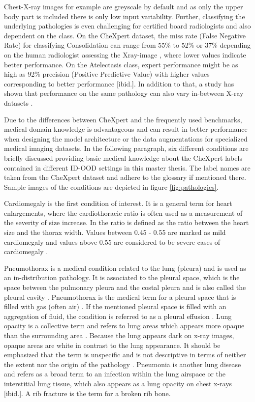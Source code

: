 Chest-X-ray images for example are greyscale by default and as only the upper body part is included there is only low input variability.
Further, classifying the underlying pathologies is even challenging for certified board radiologists and also dependent on the class.
On the CheXpert dataset, the miss rate (False Negative Rate) for classifying Consolidation can range from 55\% to 52\% or 37\% depending on the human radiologist assessing the Xray-image \citep{Irvin2019}, where lower values indicate better performance.
On the Atelectasis class, expert performance might be as high as 92\% precision (Positive Predictive Value) with higher values corresponding to better performance [ibid.].
In addition to that, a study has shown that performance on the same pathology can also vary in-between X-ray datasets \citep{Majkowska2020}.
\par
Due to the differences between CheXpert and the frequently used benchmarks, medical domain knowledge is advantageous and can result in better performance when designing the model architecture or the data augmentations for specialized medical imaging datasets.
In the following paragraph, six different conditions are briefly discussed providing basic medical knowledge about the CheXpert labels contained in different ID-OOD settings in this master thesis.
The label names are taken from the CheXpert dataset \citep{Irvin2019} and adhere to the glossary \citep{Hansell2008} if mentioned there.
Sample images of the conditions are depicted in figure \ref{fig:pathologies}.
\par
Cardiomegaly is the first condition of interest.
It is a general term for heart enlargements, where the cardiothoracic ratio is often used as a measurement of the severity of size increase.
In \citep{Dahnert2011} the ratio is defined as the ratio between the heart size and the thorax width. 
Values between 0.45 - 0.55 are marked as mild cardiomegaly and values above 0.55 are considered to be severe cases of cardiomegaly \citep{Dahnert2011}.
\par 
Pneumothorax is a medical condition related to the lung (pleura) and is used as an in-distribution pathology.
It is associated to the pleural space, which is the space between the pulmonary pleura and the costal pleura and is also called the pleural cavity \citep{Charalampidis2015}.
Pneumothorax is the medical term for a pleural space that is filled with gas (often air) \citep{Dahnert2011,Hansell2008}.
If the mentioned pleural space is filled with an aggregation of fluid, the condition is referred to as a pleural effusion \citep{Karkhanis2012}.
Lung opacity is a collective term and refers to lung areas which appears more opaque than the surrounding area \citep{Hansell2008}.
Because the lung appears dark on x-ray images, opaque areas are white in contrast to the lung appearance.
It should be emphasized that the term is unspecific and is not descriptive in terms of neither the extent nor the origin of the pathology \citep{Hansell2008}.
Pneumonia is another lung disease and refers as a broad term to an infection within the lung airspace or the interstitial lung tissue, which also appears as a lung opacity on chest x-rays [ibid.].
A rib fracture is the term for a broken rib bone.
